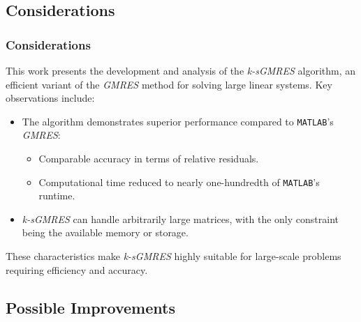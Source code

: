 \subsection{Considerations}

\begin{frame}
    \frametitle{Considerations}

    This work presents the development and analysis of the \textit{k-sGMRES} algorithm, an efficient variant of the \textit{GMRES} method for solving large linear systems. Key observations include:

    \begin{itemize}
        \item The algorithm demonstrates superior performance compared to \lstinline{MATLAB}'s \textit{GMRES}:
        \begin{itemize}
            \item Comparable accuracy in terms of relative residuals.
            \item Computational time reduced to nearly one-hundredth of \lstinline{MATLAB}'s runtime.
        \end{itemize}
        \item \textit{k-sGMRES} can handle arbitrarily large matrices, with the only constraint being the available memory or storage.
    \end{itemize}

    These characteristics make \textit{k-sGMRES} highly suitable for large-scale problems requiring efficiency and accuracy.
\end{frame}

\subsection{Possible Improvements}

